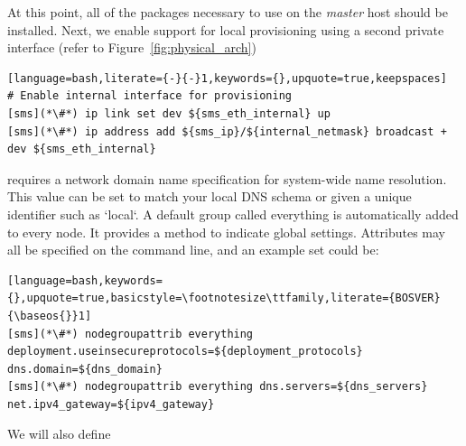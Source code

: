 At this point, all of the packages necessary to use \Confluent{} on the {\em master}
host should be installed. Next, we enable support for local provisioning using
a second private interface (refer to Figure~\ref{fig:physical_arch})

\begin{lstlisting}[language=bash,literate={-}{-}1,keywords={},upquote=true,keepspaces]
# Enable internal interface for provisioning
[sms](*\#*) ip link set dev ${sms_eth_internal} up
[sms](*\#*) ip address add ${sms_ip}/${internal_netmask} broadcast + dev ${sms_eth_internal}

\end{lstlisting}


\noindent \Confluent{} requires a network domain name specification for system-wide name
resolution. This value can be set to match your local DNS schema or given a
unique identifier such as `local`. A default group called everything is
automatically added to every node. It provides a method to indicate global settings.
Attributes may all be specified on the command line, and an example set could be:

\begin{lstlisting}[language=bash,keywords={},upquote=true,basicstyle=\footnotesize\ttfamily,literate={BOSVER}{\baseos{}}1]
[sms](*\#*) nodegroupattrib everything deployment.useinsecureprotocols=${deployment_protocols} dns.domain=${dns_domain}
[sms](*\#*) nodegroupattrib everything dns.servers=${dns_servers} net.ipv4_gateway=${ipv4_gateway}
\end{lstlisting}

\noindent We will also define
